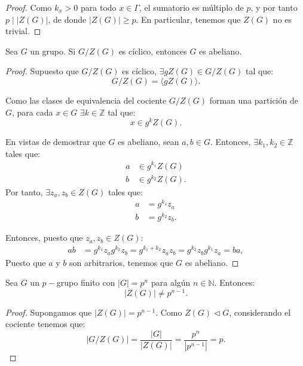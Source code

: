 \begin{ejercicio}
\begin{teo}[de Burnside]
\begin{proof}
            Como \(k_x > 0\) para todo \(x\in \Gamma\), el sumatorio es múltiplo de \(p\), y por tanto $p\mid |Z(G)|$, de donde $|Z(G)|\geq p$. En particular, tenemos que \(Z(G)\) no es trivial.
        \end{proof}
    \end{teo}

    \begin{lema}
        Sea \(G\) un grupo. Si $G/Z(G)$ es cíclico, entonces \(G\) es abeliano.
        \begin{proof}
            Supuesto que \(G/Z(G)\) es cíclico, \(\exists gZ(G)\in G/Z(G)\) tal que:
            \begin{equation*}
                G/Z(G) = \langle gZ(G)\rangle.
            \end{equation*}

            Como las clases de equivalencia del cociente \(G/Z(G)\) forman una partición de \(G\), para cada \(x\in G\) $\exists k\in \mathbb{Z}$ tal que:
            \begin{equation*}
                x\in g^{k} Z(G).
            \end{equation*}

            En vistas de demostrar que \(G\) es abeliano, sean $a,b\in G$. Entonces, $\exists k_1, k_2\in \mathbb{Z}$ tales que:
            \begin{align*}
                a&\in g^{k_1} Z(G)\\
                b&\in g^{k_2} Z(G).
            \end{align*}
            Por tanto, $\exists z_a, z_b\in Z(G)$ tales que:
            \begin{align*}
                a &= g^{k_1} z_a\\
                b &= g^{k_2} z_b.
            \end{align*}

            Entonces, puesto que $z_a, z_b\in Z(G)$:
            \begin{align*}
                ab &= g^{k_1} z_a g^{k_2} z_b = g^{k_1+k_2} z_a z_b
                = g^{k_2} z_b g^{k_1} z_a = b a,
            \end{align*}
            Puesto que \(a\) y \(b\) son arbitrarios, tenemos que \(G\) es abeliano.
        \end{proof}
    \end{lema}
    \begin{coro}
        Sea \(G\) un \(p-\)grupo finito con \(|G| = p^n\) para algún \(n\in \mathbb{N}\). Entonces:
        \begin{equation*}
            |Z(G)| \neq p^{n-1}.
        \end{equation*}
        \begin{proof}
            Supongamos que \(|Z(G)| = p^{n-1}\).
            Como $Z(G)\lhd G$, considerando el cociente tenemos que:
            \begin{equation*}
                \left|G/Z(G)\right| = \frac{|G|}{|Z(G)|} = \frac{p^n}{|p^{n-1}|} = p.
            \end{equation*}


\end{proof}
\end{coro}
\end{ejercicio}
